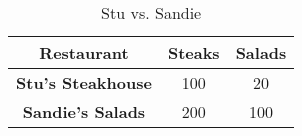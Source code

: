 \begin{table}
    \begin{tabular}{|c|c|c|}
      \hline
      \textbf{Restaurant} & \textbf{Steaks} & \textbf{Salads} \\
      \hline
      \textbf{Stu's Steakhouse} & 100 & 20 \\
      \hline
      \textbf{Sandie's Salads} & 200 & 100 \\
      \hline
    \end{tabular}
    \caption{Stu vs. Sandie}
  \end{table}